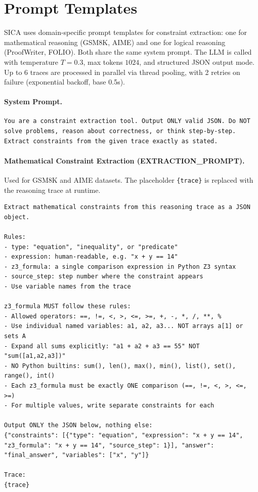 \section{Prompt Templates}
\label{app:prompts}

SICA uses domain-specific prompt templates for constraint extraction: one for mathematical reasoning (GSM8K, AIME) and one for logical reasoning (ProofWriter, FOLIO). Both share the same system prompt. The LLM is called with temperature $T{=}0.3$, max tokens $1024$, and structured JSON output mode. Up to 6 traces are processed in parallel via thread pooling, with 2 retries on failure (exponential backoff, base 0.5s).

\paragraph{System Prompt.}\leavevmode

\begin{lstlisting}
You are a constraint extraction tool. Output ONLY valid JSON. Do NOT solve problems, reason about correctness, or think step-by-step. Extract constraints from the given trace exactly as stated.
\end{lstlisting}

\paragraph{Mathematical Constraint Extraction (EXTRACTION\_PROMPT).}

Used for GSM8K and AIME datasets. The placeholder \texttt{\{trace\}} is replaced with the reasoning trace at runtime.

\begin{lstlisting}
Extract mathematical constraints from this reasoning trace as a JSON object.

Rules:
- type: "equation", "inequality", or "predicate"
- expression: human-readable, e.g. "x + y == 14"
- z3_formula: a single comparison expression in Python Z3 syntax
- source_step: step number where the constraint appears
- Use variable names from the trace

z3_formula MUST follow these rules:
- Allowed operators: ==, !=, <, >, <=, >=, +, -, *, /, **, %
- Use individual named variables: a1, a2, a3... NOT arrays a[1] or sets A
- Expand all sums explicitly: "a1 + a2 + a3 == 55" NOT "sum([a1,a2,a3])"
- NO Python builtins: sum(), len(), max(), min(), list(), set(), range(), int()
- Each z3_formula must be exactly ONE comparison (==, !=, <, >, <=, >=)
- For multiple values, write separate constraints for each

Output ONLY the JSON below, nothing else:
{"constraints": [{"type": "equation", "expression": "x + y == 14", "z3_formula": "x + y == 14", "source_step": 1}], "answer": "final_answer", "variables": ["x", "y"]}

Trace:
{trace}
\end{lstlisting}

